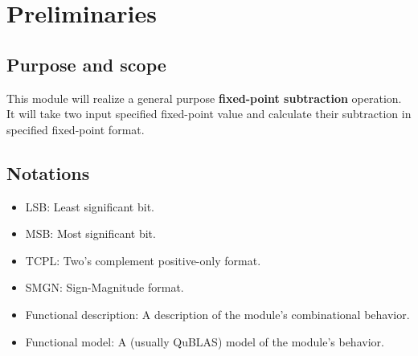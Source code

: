 \documentclass[a4paper, oneside]{report}
\author{Bolin Li}
\date{2024.11.25}
\begin{document}
    \setmainfont{TeX Gyre Heros}
    \maketitle
    \tableofcontents
    \thispagestyle{empty}
    \clearpage
    \pagestyle{fancy}
    \setcounter{page}{1}
    \chapter{Preliminaries}
        \section{Purpose and scope}
        This module will realize a general purpose \textbf{fixed-point subtraction} operation. It will take two input specified fixed-point value and calculate their subtraction in specified fixed-point format.
        \section{Notations}
            \begin{itemize}
                \item LSB: Least significant bit.
                \item MSB: Most significant bit.
                \item TCPL: Two's complement positive-only format.
                \item SMGN: Sign-Magnitude format.
                \item Functional description: A description of the module's combinational behavior.
                \item Functional model: A (usually QuBLAS) model of the module's behavior.
            \end{itemize}
\end{document}

